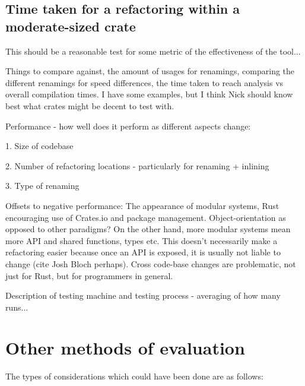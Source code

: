 \subsection{Time taken for a refactoring within a moderate-sized crate}
This should be a reasonable test for some metric of the effectiveness of the tool...

Things to compare against, the amount of usages for renamings, comparing the different renamings for speed differences, the time taken to reach analysis vs overall compilation times. 
I have some examples, but I think Nick should know best what crates might be decent to test with.

Performance - how well does it perform as different aspects change:

1. Size of codebase

2. Number of refactoring locations - particularly for renaming + inlining

3. Type of renaming

Offsets to negative performance:
The appearance of modular systems, Rust encouraging use of Crates.io and package management. Object-orientation as opposed to other paradigms? On the other hand, more modular systems mean more API and shared functions, types etc. This doesn't necessarily make a refactoring easier because once an API is exposed, it is usually not liable to change (cite Josh Bloch perhaps). Cross code-base changes are problematic, not just for Rust, but for programmers in general.

Description of testing machine and testing process - averaging of how many runs... 


\section{Other methods of evaluation}
The types of considerations which could have been done are as follows:

